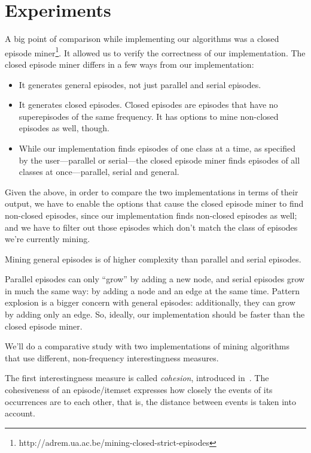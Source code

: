 \chapter{Experiments}
\label{sec:experiments}

A big point of comparison while implementing our algorithms was a closed episode miner\footnote{http://adrem.ua.ac.be/mining-closed-strict-episodes}. It allowed us to verify the correctness of our implementation. The closed episode miner differs in a few ways from our implementation:

\begin{itemize}
\item It generates general episodes, not just parallel and serial episodes.
\item It generates closed episodes. Closed episodes are episodes that have no superepisodes of the same frequency. It has options to mine non-closed episodes as well, though.
\item While our implementation finds episodes of one class at a time, as specified by the user---parallel or serial---the closed episode miner finds episodes of all classes at once---parallel, serial and general.
\end{itemize}

Given the above, in order to compare the two implementations in terms of their output, we have to enable the options that cause the closed episode miner to find non-closed episodes, since our implementation finds non-closed episodes as well; and we have to filter out those episodes which don't match the class of episodes we're currently mining.

Mining general episodes is of higher complexity than parallel and serial episodes.

Parallel episodes can only ``grow'' by adding a new node, and serial episodes grow in much the same way: by adding a node and an edge at the same time. Pattern explosion is a bigger concern with general episodes: additionally, they can grow by adding only an edge. So, ideally, our implementation should be faster than the closed episode miner.


We'll do a comparative study with two implementations of mining algorithms that use different, non-frequency interestingness measures.

The first interestingness measure is called \emph{cohesion}, introduced in~\citep{cule2016efficient}. The cohesiveness of an episode/itemset expresses how closely the events of its occurrences are to each other, that is, the distance between events is taken into account.

